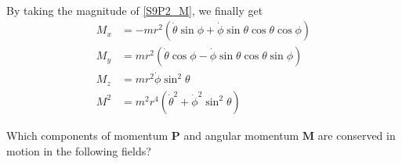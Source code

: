 \begin{problem}[title={Angular momentum in spherical co-ordinates}]
{\begin{align*}
\end{align*}
By taking the magnitude of \eqref{S9P2_M}, we finally get
}
{
\begin{align*}
    M_x &= -mr^2(\Dot{\theta}\sin{\phi} + \Dot{\phi}\sin{\theta}\cos{\theta}\cos{\phi}) \\
    M_y &= mr^2(\Dot{\theta}\cos{\phi} - \Dot{\phi}\sin{\theta}\cos{\theta}\sin{\phi}) \\
    M_z &= mr^2\Dot{\phi}\sin^2{\theta} \\
    M^2 &= m^2r^4(\Dot{\theta}^2 + \Dot{\phi}^2\sin^2{\theta})
\end{align*}
}
\end{problem}


\begin{problem}[title={Conserved momenta in symmetric fields}]
{
Which components of momentum $\mathbf{P}$ and angular momentum $\mathbf{M}$ are conserved in motion in the following fields?
}{}{}
\end{problem}
